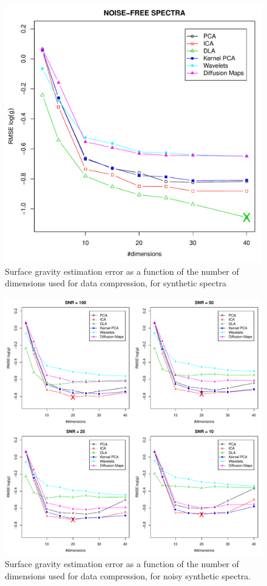 \documentclass[a4paper,fleqn,usenatbib]{mnras}
\begin{document}
{{{\begin{figure}
\centering\includegraphics[width=\columnwidth]{flamesHR10_SNR=000_Logg_log_BestSVM_N-RMSE_test.pdf}
\caption{Surface gravity estimation error as a function of the number of
  dimensions used for data compression, for synthetic spectra}
\label{fig:03}
\end{figure}

\begin{figure}
\centering\includegraphics[width=\textwidth]{flamesHR10_Logg_log_BestSVM_N-RMSE_test.pdf}
\caption{Surface gravity estimation error as a function of the number of
  dimensions used for data compression, for noisy synthetic
  spectra.}
\label{fig:04}
\end{figure}

}}}
\end{document}
